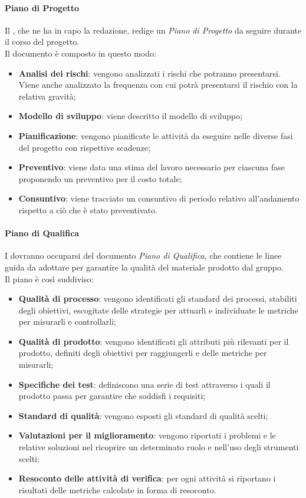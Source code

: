 			\paragraph{Piano di Progetto}
			Il , che ne ha in capo la redazione, redige un \textit{Piano di Progetto} da seguire durante	il corso del progetto.
			\\
			Il documento è composto in questo modo: 
			\begin{itemize}
				\item \textbf{Analisi dei rischi}: vengono analizzati i rischi che potranno presentarsi. Viene anche analizzato la frequenza con cui potrà presentarsi il rischio con la relativa gravità;
				\item \textbf{Modello di sviluppo}: viene descritto il modello di sviluppo;
				\item \textbf{Pianificazione}: vengono pianificate le attività da eseguire nelle diverse fasi del progetto con rispettive scadenze;
				\item \textbf{Preventivo}: viene data una stima del lavoro necessario per ciascuna fase proponendo un preventivo per il costo totale;
				\item \textbf{Consuntivo}: viene tracciato un consuntivo di periodo relativo all'andamento rispetto a ciò che è stato preventivato.
			\end{itemize}
			\paragraph{Piano di Qualifica}
			I  dovranno occuparsi del documento \textit{Piano di Qualifica}, che contiene le linee guida da adottare per garantire la qualità del materiale prodotto dal gruppo.
			\\
			Il piano è così suddiviso:			 
			\begin{itemize}
				\item \textbf{Qualità di processo}: vengono identificati gli standard dei processi, stabiliti degli obiettivi, escogitate delle strategie per attuarli e individuate le metriche per misurarli e controllarli;
				\item \textbf{Qualità di prodotto}: vengono identificati gli attributi più rilevanti per il prodotto, definiti degli obiettivi per raggiungerli e delle metriche per misurarli;
				\item \textbf{Specifiche dei test}: definiscono una serie di test attraverso i quali il prodotto passa per garantire che soddisfi i requisiti;
				\item \textbf{Standard di qualità}: vengono esposti gli standard di qualità scelti;
				\item \textbf{Valutazioni per il miglioramento}: vengono riportati i problemi e le relative soluzioni nel ricoprire un determinato ruolo e nell'uso degli strumenti scelti;
				\item \textbf{Resoconto delle attività di verifica}: per ogni attività si riportano i risultati delle metriche calcolate in forma di resoconto.
			\end{itemize}
